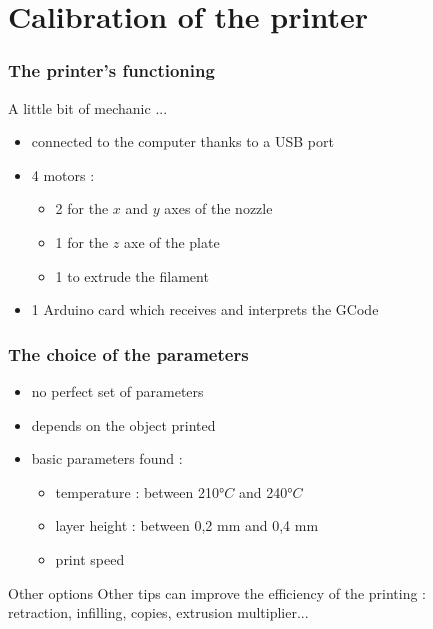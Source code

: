 \documentclass{beamer}
\begin{document}
\section{Calibration of the printer}
\begin{frame}
	\frametitle{The printer's functioning}

	\begin{block}{A little bit of mechanic ...}
	\begin{itemize}
	\item connected to the computer thanks to a USB port
	\item 4 motors : 
		\begin{itemize}
		\item 2 for the $x$ and $y$ axes of the nozzle
		\item 1 for the $z$ axe of the plate
		\item 1 to extrude the filament
		\end{itemize}
	\item 1 Arduino card which receives and interprets the GCode
	\end{itemize}	
    \end{block}
    
\end{frame}

\begin{frame}
	\frametitle{The choice of the parameters}

	\begin{block}{}
	\begin{itemize}
	\item no perfect set of parameters
	\item depends on the object printed
	\item basic parameters found :
		\begin{itemize}
		\item temperature : between 210$°C$ and 240$°C$
		\item layer height : between 0,2 mm  and 0,4 mm
		\item print speed
		\end{itemize}
	\end{itemize}	
    \end{block}
    
    \begin{block}{Other options}
    Other tips can improve the efficiency of the printing :	\\
    retraction, infilling, copies, extrusion multiplier...
    \end{block}
\end{frame}
\end{document}
